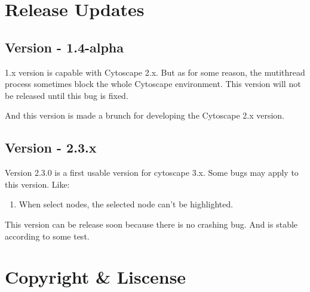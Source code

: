 \documentclass{article}
\begin{document}
\section{Release Updates}
\subsection{Version - 1.4-alpha}
1.x version is capable with Cytoscape 2.x. But as for some reason, the
mutithread process sometimes block the whole Cytoscape environment. This version
will not be released until this bug is fixed.

And this version is made a brunch for developing the Cytoscape 2.x version.

\subsection{Version - 2.3.x}
Version 2.3.0 is a first usable version for cytoscape 3.x. Some bugs may apply
to this version. Like:
\begin{enumerate}
  \item When select nodes, the selected node can't be highlighted.
\end{enumerate}
This version can be release soon because there is no crashing bug. And is stable
according to some test.

\section{Copyright \& Liscense}
\end{document}
